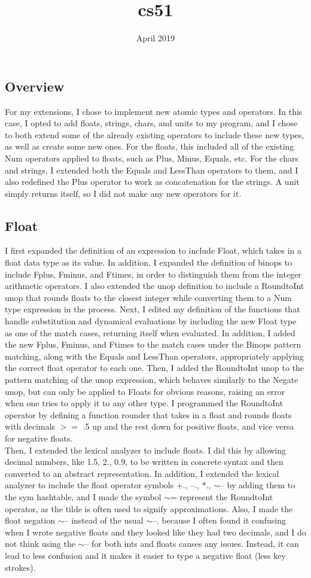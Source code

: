 \documentclass{article}
\title{cs51}
\date{April 2019}
\begin{document}
\subsection*{Overview}
 For my extensions, I chose to implement new atomic types and operators. In this case, I opted to add floats, strings, chars, and units to my program, and I chose to both extend some of the already existing operators to include these new types, as well as create some new ones. For the floats, this included all of the existing Num operators applied to floats, such as Plus, Minus, Equals, etc. For the chars and strings, I extended both the Equals and LessThan operators to them, and I also redefined the Plus operator to work as concatenation for the strings. A unit simply returns itself, so I did not make any new operators for it.
 
\subsection*{Float}
 I first expanded the definition of an expression to include Float, which takes in a float data type as its value. In addition, I expanded the definition of binops to include Fplus, Fminus, and Ftimes, in order to distinguish them from the integer arithmetic operators. I also extended the unop definition to include a RoundtoInt unop that rounds floats to the closest integer while converting them to a Num type expression in the process. Next, I edited my definition of the functions that handle substitution and dynamical evaluations by including the new Float type as one of the match cases, returning itself when evaluated. In addition, I added the new Fplus, Fminus, and Ftimes to the match cases under the Binops pattern matching, along with the Equals and LessThan operators, appropriately applying the correct float operator to each one. Then, I added the RoundtoInt unop to the pattern matching of the unop expression, which behaves similarly to the Negate unop, but can only be applied to Floats for obvious reasons, raising an error when one tries to apply it to any other type. I programmed the RoundtoInt operator by defining a function rounder that takes in a float and rounds floats with decimals $>=$ .5 up and the rest down for positive floats, and vice versa for negative floats.
 \newline
 \\ Then, I extended the lexical analyzer to include floats. I did this by allowing decimal numbers, like 1.5, 2., 0.9, to be written in concrete syntax and then converted to an abstract representation. In addition, I extended the lexical analyzer to include the float operator symbols +., --., *., $\sim$-- by adding them to the sym hashtable, and I made the symbol $\sim$= represent the RoundtoInt operator, as the tilde is often used to signify approximations. Also, I made the float negation $\sim$-- instead of the usual $\sim$--. because I often found it confusing when I wrote negative floats and they looked like they had two decimals, and I do not think using the $\sim$-- for both ints and floats causes any issues. Instead, it can lead to less confusion and it makes it easier to type a negative float (less key strokes).
\end{document}
